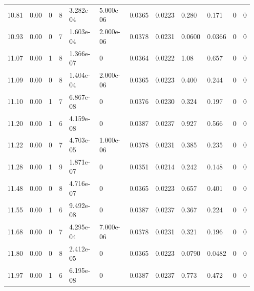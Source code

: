 \documentclass[preview]{standalone}
\begin{document}
{{{\begin{tabular}{L{1.2cm}C{1.2cm} C{0.3cm}C{0.5cm} C{1.4cm}C{1.4cm} C{1.4cm}C{1.4cm} C{1.6cm}C{1.6cm} C{1.6cm}C{1.6cm}}
  10.81  &  0.00  & 0     &  8 &  3.282e-04  & 5.000e-06  &  0.0365&   0.0223& 0.280 & 0.171   &  0 & 0  \\ 
  10.93  &  0.00  & 0     &  7 &  1.603e-04  & 2.000e-06  &  0.0378&   0.0231& 0.0600 & 0.0366   &  0 & 0  \\ 
  11.07  &  0.00  & 1     &  8 &  1.366e-07  & 0  &  0.0364&   0.0222& 1.08 & 0.657   &  0 & 0  \\ 
  11.09  &  0.00  & 0     &  8 &  1.404e-04  & 2.000e-06  &  0.0365&   0.0223& 0.400 & 0.244   &  0 & 0  \\ 
  11.10  &  0.00  & 1     &  7 &  6.867e-08  & 0  &  0.0376&   0.0230& 0.324 & 0.197   &  0 & 0  \\ 
  11.20  &  0.00  & 1     &  6 &  4.159e-08  & 0  &  0.0387&   0.0237& 0.927 & 0.566   &  0 & 0  \\ 
  11.22  &  0.00  & 0     &  7 &  4.703e-05  & 1.000e-06  &  0.0378&   0.0231& 0.385 & 0.235   &  0 & 0  \\ 
  11.28  &  0.00  & 1     &  9 &  1.871e-07  & 0  &  0.0351&   0.0214& 0.242 & 0.148   &  0 & 0  \\ 
  11.48  &  0.00  & 0     &  8 &  4.716e-07  & 0  &  0.0365&   0.0223& 0.657 & 0.401   &  0 & 0  \\ 
  11.55  &  0.00  & 1     &  6 &  9.492e-08  & 0  &  0.0387&   0.0237& 0.367 & 0.224   &  0 & 0  \\ 
  11.68  &  0.00  & 0     &  7 &  4.295e-04  & 7.000e-06  &  0.0378&   0.0231& 0.321 & 0.196   &  0 & 0  \\ 
  11.80  &  0.00  & 0     &  8 &  2.412e-05  & 0  &  0.0365&   0.0223& 0.0790 & 0.0482   &  0 & 0  \\ 
  11.97  &  0.00  & 1     &  6 &  6.195e-08  & 0  &  0.0387&   0.0237& 0.773 & 0.472   &  0 & 0  \\ 
\hline 
\end{tabular} 

}}}
\end{document}
